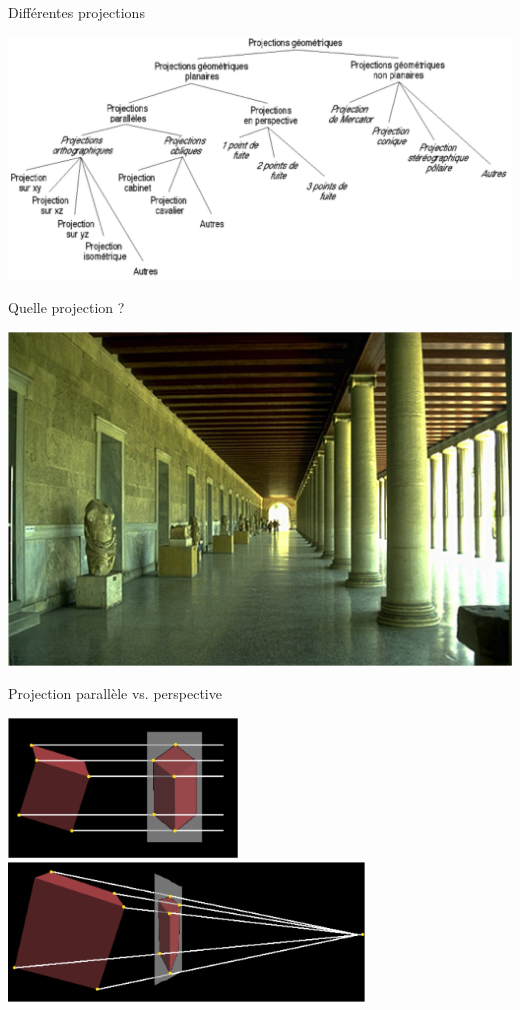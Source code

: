 \begin{frame}{Différentes projections}
\begin{center}
\includegraphics[width=.8\textwidth]{figs/projections.png}
\end{center}
\end{frame}

\begin{frame}{Quelle projection ?}
\begin{center}
\includegraphics[width=.8\textwidth]{figs/athenes.png}
\end{center}
\end{frame}

\begin{frame}{Projection parallèle vs. perspective}
\begin{center}
\includegraphics[height=3.7cm]{figs/projpar.png} \\
\includegraphics[height=3.7cm]{figs/projpersp.png} \\

\end{center}
\end{frame}

